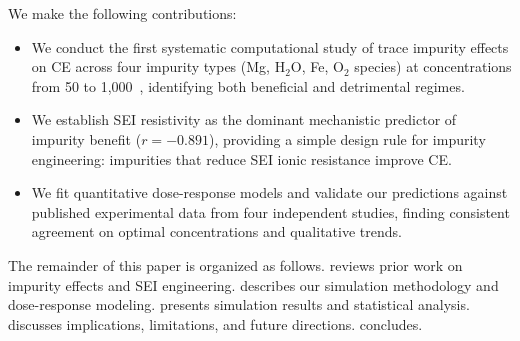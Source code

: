 We make the following contributions:
\begin{itemize}[leftmargin=*,itemsep=0pt,topsep=0pt]
    \item We conduct the first systematic computational study of trace impurity effects on CE across four impurity types (Mg, H$_2$O, Fe, O$_2$ species) at concentrations from 50 to 1{,}000~\ppm, identifying both beneficial and detrimental regimes.
    \item We establish SEI resistivity as the dominant mechanistic predictor of impurity benefit ($r=-0.891$), providing a simple design rule for impurity engineering: impurities that reduce SEI ionic resistance improve CE.
    \item We fit quantitative dose-response models and validate our predictions against published experimental data from four independent studies, finding consistent agreement on optimal concentrations and qualitative trends.
\end{itemize}

The remainder of this paper is organized as follows.  reviews prior work on impurity effects and SEI engineering.  describes our simulation methodology and dose-response modeling.  presents simulation results and statistical analysis.  discusses implications, limitations, and future directions.  concludes.
